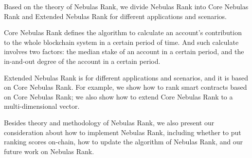 Based on the theory of Nebulas Rank, we divide Nebulas Rank into Core Nebulas
Rank and Extended Nebulas Rank for different applications and scenarios.

Core Nebulas Rank defines the algorithm to calculate an account's contribution
to the whole blockchain system in a certain period of time. And such
calculate involves two factors: the median stake of an account in a certain
period, and the in-and-out degree of the account in a certain period.

Extended Nebulas Rank is for different applications and scenarios,
and it is based on Core Nebulas Rank. For example, we show how to rank smart
contracts based on Core Nebulas Rank; we also show how to extend Core Nebulas Rank to a multi-dimensional vector.


Besides theory and methodology of Nebulas Rank, we also present our
consideration about how to implement Nebulas Rank, including whether to 
put ranking scores on-chain, how to update the algorithm of Nebulas Rank,
and our future work on Nebulas Rank.

